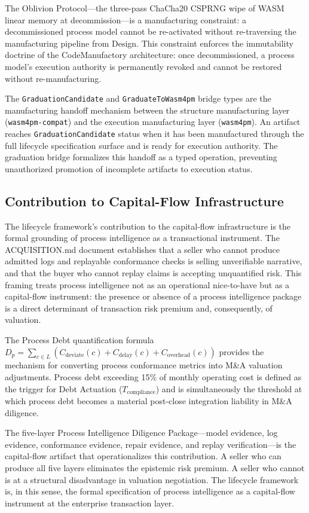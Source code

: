 The Oblivion Protocol---the three-pass ChaCha20 CSPRNG wipe of WASM linear memory
at decommission---is a manufacturing constraint: a decommissioned process model cannot
be re-activated without re-traversing the manufacturing pipeline from Design. This
constraint enforces the immutability doctrine of the CodeManufactory architecture: once
decommissioned, a process model's execution authority is permanently revoked and cannot
be restored without re-manufacturing.

The \texttt{GraduationCandidate} and \texttt{GraduateToWasm4pm} bridge types are the
manufacturing handoff mechanism between the structure manufacturing layer
(\texttt{wasm4pm-compat}) and the execution manufacturing layer (\texttt{wasm4pm}).
An artifact reaches \texttt{GraduationCandidate} status when it has been manufactured
through the full lifecycle specification surface and is ready for execution authority.
The graduation bridge formalizes this handoff as a typed operation, preventing
unauthorized promotion of incomplete artifacts to execution status.

\subsection{Contribution to Capital-Flow Infrastructure}
\label{sec:lifecycle-contribution-capital}

The lifecycle framework's contribution to the capital-flow infrastructure is the
formal grounding of process intelligence as a transactional instrument. The
ACQUISITION.md document establishes that a seller who cannot produce admitted logs and
replayable conformance checks is selling unverifiable narrative, and that the buyer
who cannot replay claims is accepting unquantified risk. This framing treats process
intelligence not as an operational nice-to-have but as a capital-flow instrument: the
presence or absence of a process intelligence package is a direct determinant of
transaction risk premium and, consequently, of valuation.

The Process Debt quantification formula $D_p = \sum_{c \in L}(C_{\mathrm{deviate}}(c)
+ C_{\mathrm{delay}}(c) + C_{\mathrm{overhead}}(c))$ provides the mechanism for
converting process conformance metrics into M\&A valuation adjustments. Process debt
exceeding 15\% of monthly operating cost is defined as the trigger for Debt Actuation
($T_{\mathrm{compliance}}$) and is simultaneously the threshold at which process debt
becomes a material post-close integration liability in M\&A diligence.

The five-layer Process Intelligence Diligence Package---model evidence, log evidence,
conformance evidence, repair evidence, and replay verification---is the capital-flow
artifact that operationalizes this contribution. A seller who can produce all five
layers eliminates the epistemic risk premium. A seller who cannot is at a structural
disadvantage in valuation negotiation. The lifecycle framework is, in this sense, the
formal specification of process intelligence as a capital-flow instrument at the
enterprise transaction layer.
